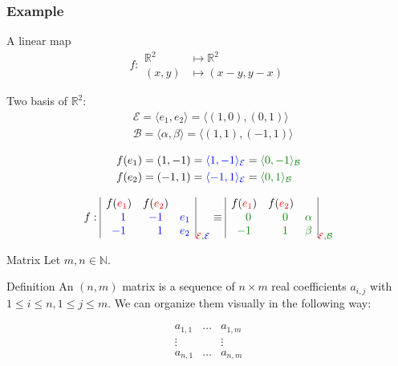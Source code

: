 \documentclass{beamer}
\begin{document}
\begin{frame}
  \frametitle{Example}
  \begin{exampleblock}{A linear map}
    \[f: \begin{aligned} \mathbb{R}^2 &\mapsto \mathbb{R}^2\\ (x,y) &\mapsto (x - y, y - x) \end{aligned}\]

    Two basis of $\mathbb{R}^2 :$
    \[\begin{aligned}
    &\mathcal{E} = \langle e_1, e_2 \rangle = \langle (1,0), (0,1) \rangle \\ 
    &\mathcal{B} = \langle \alpha, \beta \rangle = \langle (1,1), (-1, 1) \rangle\\
    \end{aligned}
    \]
    \[
    \begin{aligned}
      &f(e_1) = (1,-1) = {\color{blue} \langle 1, -1 \rangle_{\mathcal{E}}} = {\color{darkgreen} \langle 0, -1\rangle_{\mathcal{B}}}\\
      &f(e_2) = (-1, 1) = {\color{blue} \langle -1, 1 \rangle_{\mathcal{E}}} = {\color{darkgreen} \langle 0, 1 \rangle_{\mathcal{B}}} \\      
    \end{aligned}
    \]


    \[f:
    \begin{array}{|ccc|}
      f({\color{red}e_1}) & f({\color{red}e_2}) & \\
      \color{blue}\phantom{-}1 & \color{blue} -1 & \color{blue} e_1\\
      \color{blue}-1 & \color{blue} \phantom{-}1 & \color{blue} e_2
    \end{array}_{{\color{red}\mathcal{E}}, {\color{blue}\mathcal{E}}}
    \equiv
    \begin{array}{|ccc|}
      f({\color{red}e_1}) & f({\color{red}e_2}) & \\
      \color{darkgreen}\phantom{-}0 & \color{darkgreen} \phantom{-}0 & \color{darkgreen} \alpha\\
      \color{darkgreen} -1 & \color{darkgreen}\phantom{-}1 & \color{darkgreen} \beta
    \end{array}_{{\color{red}\mathcal{E}}, {\color{darkgreen} \mathcal{B} }}
    \]

    
  \end{exampleblock}
\end{frame}


\begin{frame}
  {Matrix}
  Let $m, n \in \mathbb{N}$.
  \begin{block}{Definition}
    An $(n,m)$ matrix is a sequence of $n \times m$ real coefficients $a_{i,j}$ with $1 \le i \le n, 1 \le j \le m$. We can organize them visually in the following way:

    \[\begin{array}{|ccc|} a_{1,1} & \dots & a_{1,m}\\ \vdots & & \vdots\\ a_{n,1} & \dots & a_{n, m} \end{array}\]
  \end{block}
\end{frame}
\end{document}
